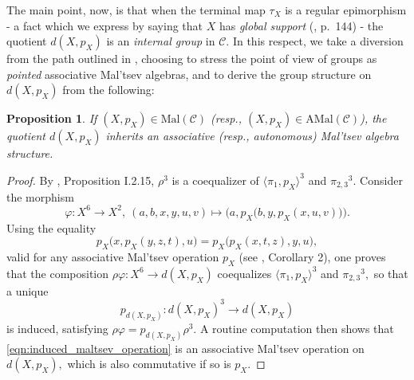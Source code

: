 \documentclass[11pt]{amsart}
\theoremstyle{plain}
\newtheorem{proposition}[subsubsection]{Proposition}
\theoremstyle{definition}
\theoremstyle{remark}
\begin{document}
The main point, now, is that when the terminal map $\tau_X$ is a regular epimorphism - a fact which we express by saying that $X$ has \emph{global support} (\cite{tower}, p.~144) - the quotient $d(X,p_X)$ is an \emph{internal group} in $\mathcal{C}.$ In this respect, we take a diversion from the path outlined in \cite{baer-sums}, choosing to stress the point of view of groups as \emph{pointed} associative Mal'tsev algebras, and to derive the group structure on $d(X,p_X)$ from the following:
\begin{proposition}
If $(X,p_X)\in\mathrm{Mal}(\mathcal{C})$ (resp., $(X,p_X)\in\mathrm{AMal}(\mathcal{C})$), the quotient $d(X,p_X)$ inherits an associative (resp., autonomous) Mal'tsev algebra structure.
\end{proposition}
\begin{proof}
By \cite{barr}, Proposition I.2.15, $\rho^3$ is a coequalizer of $\langle \pi_1,p_X \rangle^3$ and ${\pi_{2,3}}^3.$ Consider the morphism
\[
\varphi\colon X^6\rightarrow X^2, \ (a,b,x,y,u,v)\mapsto\Big(a,p_X\big(b,y,p_X(x,u,v)\big)\Big).
\]
Using the equality
\[
p_X\big(x,p_X(y,z,t),u\big)=p_X\big(p_X(x,t,z),y,u\big),
\]
valid for any associative Mal'tsev operation $p_X$ (see \cite{baer-sums}, Corollary 2), one proves that the composition $\rho\varphi\colon X^6\rightarrow d(X,p_X)$ coequalizes $\langle \pi_1,p_X \rangle^3$ and ${\pi_{2,3}}^3,$ so that a unique
\begin{equation}
\label{eqn:induced_maltsev_operation}
p_{d(X,p_X)}\colon d(X,p_X)^3\rightarrow d(X,p_X)
\end{equation}
is induced, satisfying $\rho\varphi=p_{d(X,p_X)}\rho^3.$ A routine computation then shows that \eqref{eqn:induced_maltsev_operation} is an associative Mal'tsev operation on $d(X,p_X),$ which is also commutative if so is $p_X.$
\end{proof}
\end{document}
